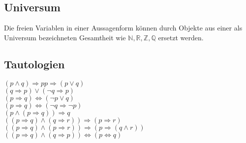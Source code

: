 \subsection*{Universum}
Die freien Variablen in einer Aussagenform können durch Objekte aus einer als
Universum bezeichneten Gesamtheit wie $\mathbb{N},\mathbb{R},\mathbb{Z},\mathbb{Q}$ ersetzt werden.
\subsection*{Tautologien}
$(p\wedge q)\Rightarrow p$$p\Rightarrow (p\vee q)$\\
$(q\Rightarrow p)\vee (\neg q\Rightarrow p)$\\
$(p\Rightarrow q)\Leftrightarrow (\neg p\vee q)$\\
$(p\Rightarrow q)\Leftrightarrow (\neg q\Rightarrow\neg p)$ \hfill{}\\
$(p\wedge (p\Rightarrow q))\Rightarrow q$ \hfill{}\\
$((p\Rightarrow q)\wedge (q\Rightarrow r))\Rightarrow (p\Rightarrow r)$\\
$((p\Rightarrow q)\wedge (p\Rightarrow r))\Rightarrow (p\Rightarrow (q\wedge r))$\\
$((p\Rightarrow q)\wedge (q\Rightarrow p))\Leftrightarrow (p\Leftrightarrow q)$
